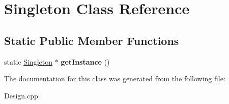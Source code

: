 \hypertarget{classSingleton}{}\section{Singleton Class Reference}
\label{classSingleton}
\subsection*{Static Public Member Functions}
\begin{DoxyCompactItemize}
\item 
static \hyperlink{classSingleton}{Singleton} $\ast$ {\bfseries get\+Instance} ()\hypertarget{classSingleton_af8429228a6d84251c342c4f90fc73f44}{}\label{classSingleton_af8429228a6d84251c342c4f90fc73f44}

\end{DoxyCompactItemize}


The documentation for this class was generated from the following file\+:\begin{DoxyCompactItemize}
\item 
Design.\+cpp\end{DoxyCompactItemize}
